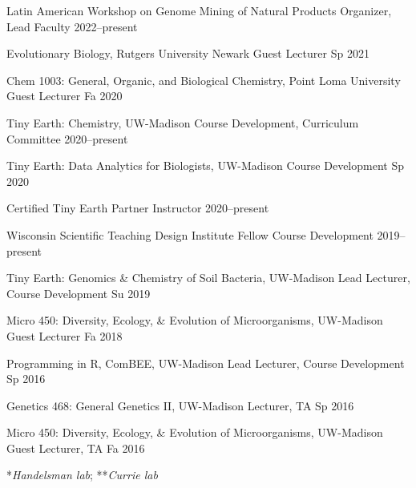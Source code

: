 


\begin{cvhonors}

\cvhonor
{Latin American Workshop on Genome Mining of Natural Products}
{Organizer, Lead Faculty}
{2022--present}

\cvhonor
{Evolutionary Biology, Rutgers University Newark}
{Guest Lecturer}
{Sp 2021}

\cvhonor
{Chem 1003: General, Organic, and Biological Chemistry, Point Loma University}
{Guest Lecturer}
{Fa 2020}

\cvhonor
{Tiny Earth: Chemistry, UW-Madison}
{Course Development, Curriculum Committee}
{2020--present}

\cvhonor
{Tiny Earth: Data Analytics for Biologists, UW-Madison}
{Course Development}
{Sp 2020}

\cvhonor
{Certified Tiny Earth Partner Instructor}
{}
{2020--present}

\cvhonor
{Wisconsin Scientific Teaching Design Institute Fellow}
{Course Development}
{2019--present}

\cvhonor
{Tiny Earth: Genomics \& Chemistry of Soil Bacteria, UW-Madison}
{Lead Lecturer, Course Development}
{Su 2019}

\cvhonor
{Micro 450: Diversity, Ecology, \& Evolution of Microorganisms, UW-Madison}
{Guest Lecturer}
{Fa 2018}

\cvhonor
{Programming in R, ComBEE, UW-Madison}
{Lead Lecturer, Course Development}
{Sp 2016}

\cvhonor
{Genetics 468: General Genetics II, UW-Madison}
{Lecturer, TA}
{Sp 2016}

\cvhonor
{Micro 450: Diversity, Ecology, \& Evolution of Microorganisms, UW-Madison}
{Guest Lecturer, TA}
{Fa 2016}

\end{cvhonors}

\vspace{1.5mm}


\vspace{-1.5mm}

\begin{cvpubs}

\cvpub
{\hspace{-1cm} *\textit{Handelsman lab}; **\textit{Currie lab}}
{}

\end{cvpubs}


